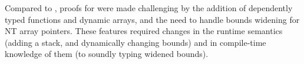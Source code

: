   Compared to \citet{ruef18checkedc-incr}, proofs for
  \lang were made challenging by the addition of dependently typed
  functions and dynamic arrays, and the need to handle bounds widening for NT
  array pointers. These features required changes in the runtime
  semantics (adding a stack, and dynamically changing bounds) and in
  compile-time knowledge of them (to soundly typing widened bounds).





